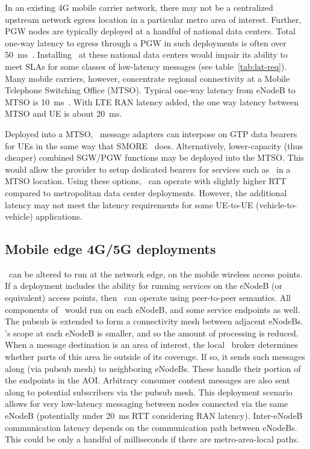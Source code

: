 In an existing 4G mobile carrier network, there may not be a
centralized upstream network egress location in a particular metro
area of interest. Further, PGW nodes are typically deployed at a
handful of national data centers.  Total one-way latency to egress
through a PGW in such deployments is often over
50~ms~\cite[Chapter~7]{grigorik2013high}. Installing \name~at these national
data centers would impair its ability to meet SLAs for some classes of
low-latency messages (see table~\ref{tab:lat-req}). Many mobile
carriers, however, concentrate regional connectivity at a Mobile
Telephone Switching Office (MTSO).  Typical one-way latency from
eNodeB to MTSO is 10~ms~\cite{cho2014smore}. With LTE RAN latency
added, the one way latency between MTSO and UE is about 20~ms.

Deployed into a MTSO, \name~message adapters can interpose on GTP
data bearers for UEs in the same way that SMORE~\cite{cho2014smore}
does. Alternatively, lower-capacity (thus cheaper) combined SGW/PGW
functions may be deployed into the MTSO. This would allow the provider
to setup dedicated bearers for services such as \name~in a MTSO
location.  Using these options, \name~can operate with slightly
higher RTT compared to metropolitan data center deployments.  However,
the additional latency may not meet the latency requirements for some
UE-to-UE (vehicle-to-vehicle) applications.

\subsection{Mobile edge 4G/5G deployments}

\name~can be altered to run at the network edge, on the mobile
wireless access points.  If a deployment includes the ability for
running services on the eNodeB (or equivalent) access points, then
\name~can operate using peer-to-peer semantics.  All components of
\name~would run on each eNodeB, and some service endpoints as
well. The pubsub is extended to form a connectivity mesh between
adjacent eNodeBs. \name's scope at each eNodeB is smaller, and so
the amount of processing is reduced. When a message destination is an
area of interest, the local \name~broker determines whether parts of
this area lie outside of its coverage.  If so, it sends such messages
along (via pubsub mesh) to neighboring eNodeBs. These handle their
portion of the endpoints in the AOI.  Arbitrary consumer content
messages are also sent along to potential subscribers via the pubsub
mesh.  This deployment scenario allows for very low-latency messaging
between nodes connected via the same eNodeB (potentially under 20~ms
RTT considering RAN latency). Inter-eNodeB communication latency
depends on the communication path between eNodeBs.  This could be only
a handful of milliseconds if there are metro-area-local paths.

